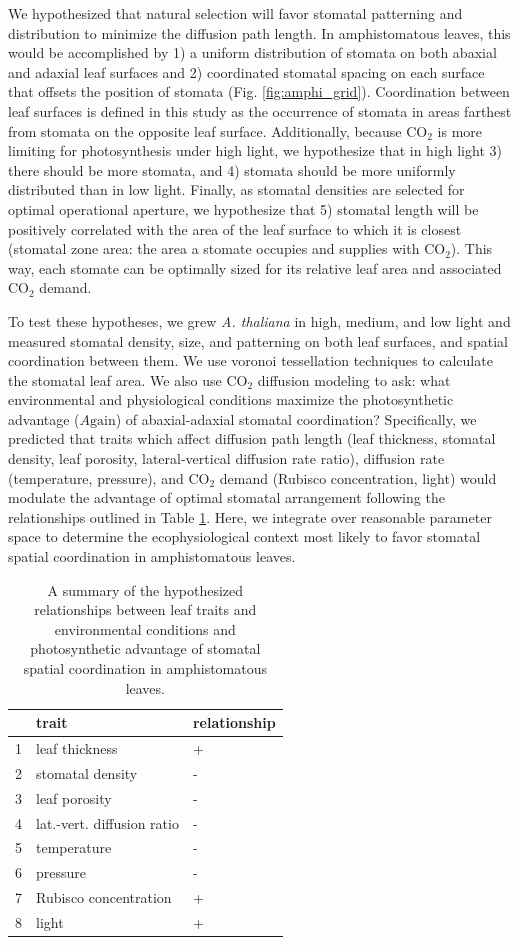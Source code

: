 \documentclass[12pt,halfline,a4paper,]{ouparticle}
\begin{document}
We hypothesized that natural selection will favor stomatal patterning
and distribution to minimize the diffusion path length. In
amphistomatous leaves, this would be accomplished by 1) a uniform
distribution of stomata on both abaxial and adaxial leaf surfaces and 2)
coordinated stomatal spacing on each surface that offsets the position
of stomata (Fig. \ref{fig:amphi_grid}). Coordination between leaf
surfaces is defined in this study as the occurrence of stomata in areas
farthest from stomata on the opposite leaf surface. Additionally,
because CO\(_2\) is more limiting for photosynthesis under high light,
we hypothesize that in high light 3) there should be more stomata, and
4) stomata should be more uniformly distributed than in low light.
Finally, as stomatal densities are selected for optimal operational
aperture, we hypothesize that 5) stomatal length will be positively
correlated with the area of the leaf surface to which it is closest
(stomatal zone area: the area a stomate occupies and supplies with
CO\(_2\)). This way, each stomate can be optimally sized for its
relative leaf area and associated CO\(_2\) demand.

To test these hypotheses, we grew \emph{A. thaliana} in high, medium,
and low light and measured stomatal density, size, and patterning on
both leaf surfaces, and spatial coordination between them. We use
voronoi tessellation techniques to calculate the stomatal leaf area. We
also use CO\(_2\) diffusion modeling to ask: what environmental and
physiological conditions maximize the photosynthetic advantage
(\(A\text{gain}\)) of abaxial-adaxial stomatal coordination?
Specifically, we predicted that traits which affect diffusion path
length (leaf thickness, stomatal density, leaf porosity,
lateral-vertical diffusion rate ratio), diffusion rate (temperature,
pressure), and CO\(_2\) demand (Rubisco concentration, light) would
modulate the advantage of optimal stomatal arrangement following the
relationships outlined in Table \ref{tab:hypotheses}. Here, we integrate
over reasonable parameter space to determine the ecophysiological
context most likely to favor stomatal spatial coordination in
amphistomatous leaves.

\begin{table}[ht]
\centering
\begin{tabular}{rll}
  \hline
 & trait & relationship \\ 
  \hline
1 & leaf thickness & + \\ 
  2 & stomatal density & - \\ 
  3 & leaf porosity & - \\ 
  4 & lat.-vert. diffusion ratio & - \\ 
  5 & temperature & - \\ 
  6 & pressure & - \\ 
  7 & Rubisco concentration & + \\ 
  8 & light & + \\ 
   \hline
\end{tabular}
\caption{A summary of the hypothesized relationships between leaf traits and environmental conditions and photosynthetic advantage of stomatal spatial coordination in amphistomatous leaves.} 
\label{tab:hypotheses}
\end{table}
\end{document}
